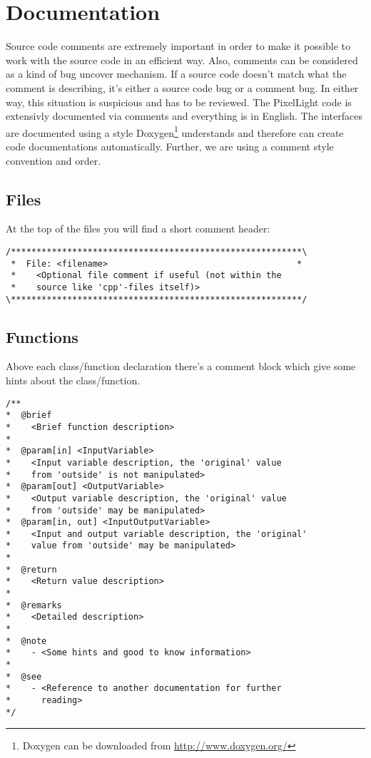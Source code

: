\chapter{Documentation}
Source code comments are extremely important in order to make it possible to work with the source code in an efficient way. Also, comments can be considered as a kind of bug uncover mechanism. If a source code doesn't match what the comment is describing, it's either a source code bug or a comment bug. In either way, this situation is suspicious and has to be reviewed. The PixelLight code is extensivly documented via comments and everything is in English. The interfaces are documented using a style Doxygen\footnote{Doxygen can be downloaded from \url{http://www.doxygen.org/}} understands and therefore can create code documentations automatically. Further, we are using a comment style convention and order.




\section{Files}
At the top of the files you will find a short comment header:

\begin{lstlisting}[caption=Header comment]
/*********************************************************\
 *  File: <filename>                                     *
 *    <Optional file comment if useful (not within the
 *    source like 'cpp'-files itself)>
\*********************************************************/
\end{lstlisting}




\section{Functions}
Above each class/function declaration there's a comment block which give some hints about the class/function.

\begin{lstlisting}[caption=Class/function comment block]
/**
*  @brief
*    <Brief function description>
*
*  @param[in] <InputVariable>
*    <Input variable description, the 'original' value
*    from 'outside' is not manipulated>
*  @param[out] <OutputVariable>
*    <Output variable description, the 'original' value
*    from 'outside' may be manipulated>
*  @param[in, out] <InputOutputVariable>
*    <Input and output variable description, the 'original'
*    value from 'outside' may be manipulated>
*
*  @return
*    <Return value description>
*
*  @remarks
*    <Detailed description>
*
*  @note
*    - <Some hints and good to know information>
*
*  @see
*    - <Reference to another documentation for further
*      reading>
*/
\end{lstlisting}


